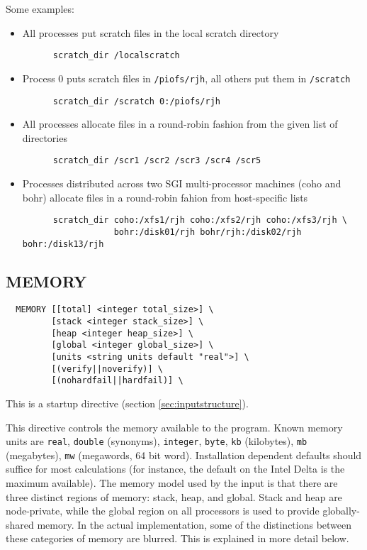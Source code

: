Some examples:
\begin{itemize}
\item  All processes put scratch files in the local scratch directory
\begin{verbatim}
      scratch_dir /localscratch
\end{verbatim}
\item Process 0 puts scratch files in \verb+/piofs/rjh+, all others put them
  in \verb+/scratch+
\begin{verbatim}
      scratch_dir /scratch 0:/piofs/rjh
\end{verbatim}
\item All processes allocate files in a round-robin fashion from the
given list of directories
\begin{verbatim}
      scratch_dir /scr1 /scr2 /scr3 /scr4 /scr5
\end{verbatim}
\item Processes distributed across two SGI multi-processor machines
  (coho and bohr) allocate files in a round-robin fahion from
  host-specific lists
\begin{verbatim}
      scratch_dir coho:/xfs1/rjh coho:/xfs2/rjh coho:/xfs3/rjh \
                  bohr:/disk01/rjh bohr/rjh:/disk02/rjh bohr:/disk13/rjh
\end{verbatim}
\end{itemize}

\subsection{MEMORY}

\begin{verbatim}
  MEMORY [[total] <integer total_size>] \
         [stack <integer stack_size>] \
         [heap <integer heap_size>] \
         [global <integer global_size>] \
         [units <string units default "real">] \
         [(verify||noverify)] \
         [(nohardfail||hardfail)] \
\end{verbatim}

This is a startup directive (section \ref{sec:inputstructure}).

This directive controls the memory available to the program.  Known
memory units are \verb+real+, \verb+double+ (synonyms),
\verb+integer+, \verb+byte+, \verb+kb+ (kilobytes), \verb+mb+
(megabytes), \verb+mw+ (megawords, 64 bit word).  Installation
dependent defaults should suffice for most calculations (for instance,
the default on the Intel Delta is the maximum available).  The memory
model used by the input is that there are three distinct regions of
memory: stack, heap, and global.  Stack and heap are node-private,
while the global region on all processors is used to provide
globally-shared memory.  In the actual implementation, some of the
distinctions between these categories of memory are blurred.  This is
explained in more detail below.

